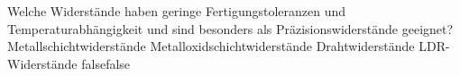     {Welche Widerstände haben geringe Fertigungstoleranzen und Temperaturabhängigkeit und sind besonders als Präzisionswiderstände geeignet?}
    {Metallschichtwiderstände}
    {Metalloxidschichtwiderstände}
    {Drahtwiderstände}
    {LDR-Widerstände}
    {false}{false}